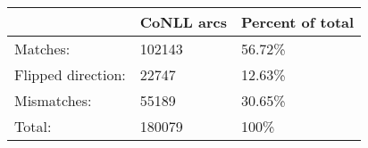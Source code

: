 	\begin{tabular}{|l|l|l|}
		\hline
		 & CoNLL arcs & Percent of total \\ 
		\hline
		Matches: & 102143 & 56.72\%\\ 
		\hline
		Flipped direction: & 22747 & 12.63\%\\ 
		\hline
		Mismatches: & 55189 & 30.65\%\\ 
		\hline
		Total: & 180079 & 100\% \\ 
		\hline
	\end{tabular}
